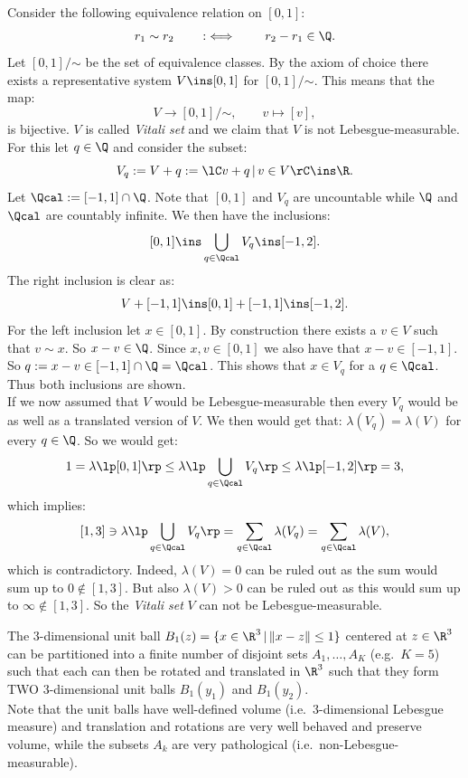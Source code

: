 \begin{Eg}
    Consider the following equivalence relation on $[0,1]$:
    \[ r_1 \sim r_2 \qquad :\iff \qquad r_2-r_1 \in \Q.\]
    Let $[0,1]/\mathord{\sim}$ be the set of equivalence classes.
    By the axiom of choice there exists a representative system $V \ins [0,1]$ for $[0,1]/\mathord{\sim}$.
    This means that the map:
    \[ V \to [0,1]/\mathord{\sim}, \qquad v \mapsto [v],\]
    is bijective. $V$ is called \emph{Vitali set} and we claim that $V$ is not Lebesgue-measurable.\\
    For this let $q \in \Q$ and consider the subset:
    \[V_q :=  V+q := \lC v + q \,|\, v \in V \rC  \ins \R. \]
    Let $\Qcal := [-1,1] \cap \Q$.  Note that $[0,1]$ and $V_q$ are uncountable while $\Q$ and $\Qcal$ are countably infinite. 
    We then have the inclusions:
    \[ [0,1] \ins  \bigcup_{ q \in \Qcal} V_q \ins [-1,2].\]
    The right inclusion is clear as:
     \[V + [-1,1] \ins [0,1]+[-1,1] \ins [-1,2].\]
    For the left inclusion let $ x\in [0,1]$. By construction there exists a $v \in V$ such that $v \sim x$. 
    So $x - v \in \Q$. Since $x,v \in [0,1]$ we also have that $x-v \in [-1,1]$. So $q := x-v \in [-1,1] \cap \Q =\Qcal$.
    This shows that $ x \in V_q$ for a $q \in \Qcal$. Thus both inclusions are shown.\\
    If we now assumed that $V$ would be Lebesgue-measurable then every $V_q$ would be as well as a translated version of $V$.
    We then would get that: $\lambda(V_q) = \lambda(V)$ for every $q\in \Q$. So we would get:
    \[ 1 = \lambda \lp[0,1]\rp \le \lambda\lp\bigcup_{ q \in \Qcal} V_q \rp   \le \lambda \lp[-1,2]\rp =3  ,\]
    which implies:
    \[ [1,3] \ni \lambda\lp\bigcup_{ q \in \Qcal} V_q \rp = \sum_{ q\in \Qcal} \lambda(V_q) = 
    \sum_{ q\in \Qcal} \lambda(V), \]
    which is contradictory. Indeed, $\lambda(V) =0$ can be ruled out as the sum would sum up to $0 \notin [1,3]$.
    But also $\lambda(V)>0$ can be ruled out as this would sum up to $\infty \notin [1,3]$.
    So the \emph{Vitali set} $V$ can not be Lebesgue-measurable.
\end{Eg}




\begin{Thm}
    \label{thm-banach-tarski}
    The 3-dimensional unit ball $B_1(z)=\{ x \in \R^3\,|\, \|x-z\| \le 1\}$ centered at $z \in \R^3$ can be partitioned into a finite number of disjoint sets $A_1,\dots,A_K$ (e.g.\ $K=5$) such that each can then be rotated and translated in $\R^3$ such that they form TWO 3-dimensional unit balls $B_1(y_1)$ and $B_1(y_2)$.\\
    Note that the unit balls have well-defined volume (i.e.\ 3-dimensional Lebesgue measure) and translation and rotations are very well behaved and preserve volume, while the subsets $A_k$ are very pathological (i.e.\ non-Lebesgue-measurable).
\end{Thm}


